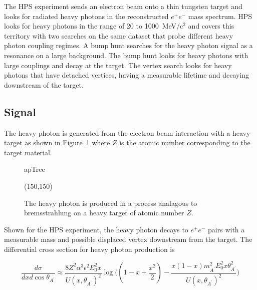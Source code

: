The HPS experiment sends an electron beam onto a thin tungsten target and looks for radiated heavy photons in the reconstructed $e^+e^-$ mass spectrum. HPS looks for heavy photons in the range of 20 to 1000~MeV/c$^2$ and covers this territory with two searches on the same dataset that probe different heavy photon coupling regimes. A bump hunt searches for the heavy photon signal as a resonance on a large background. The bump hunt looks for heavy photons with large couplings and decay at the target. The vertex search looks for heavy photons that have detached vertices, having a measurable lifetime and decaying downstream of the target. 

\subsection{Signal}

The heavy photon is generated from the electron beam interaction with a heavy target as shown in Figure~\ref{fig:apTree} where $Z$ is the atomic number corresponding to the target material.  

\begin{figure}[htb]
    \begin{center}
	\begin{fmffile}{apTree}
	\begin{fmfgraph*}(150,150)
	\fmfstraight
		\fmffreeze
		\fmffreeze	
	\end{fmfgraph*}
	\end{fmffile}
  	\end{center}
    	\caption[Heavy photon production in a fixed-target experiment]{The heavy photon is produced in a process analagous to bremsstrahlung on a heavy target of atomic number $Z$.}
   	 \label{fig:apTree}	
\end{figure}

Shown for the HPS experiment, the heavy photon decays to $e^+e^-$ pairs with a measurable mass and possible displaced vertex downstream from the target. The differential cross section for heavy photon production is 

\begin{equation}
	\label{eq:apDiffCS}
	\dfrac{d\sigma}{dxd\cos\theta_{A^{\prime}}} \approx \dfrac{8Z^2\alpha^3\epsilon^2E_0^2x}{U(x,\theta_{A^{\prime}})^2}\log\Big( (1-x+\dfrac{x^2}{2})-\dfrac{x(1-x)m_{A^{\prime}}^2E_0^2x\theta_{A^{\prime}}^2}{U(x,\theta_{A^{\prime}})^2}\Big)
\end{equation}

